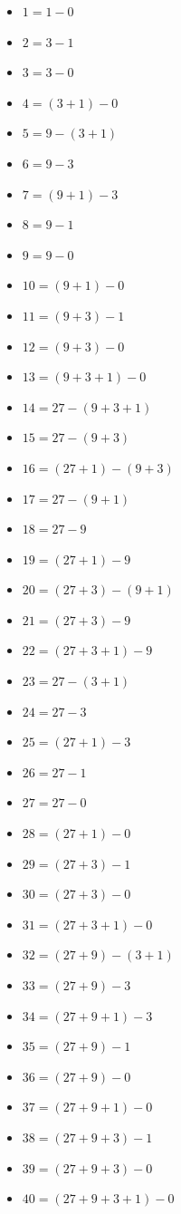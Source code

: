 \begin{multicols}{3}
\begin{itemize}
\item $1=1-0$
\item $2=3-1$
\item $3=3-0$
\item $4=(3+1)-0$
\item $5=9-(3+1)$
\item $6=9-3$
\item $7=(9+1)-3$
\item $8=9-1$
\item $9=9-0$
\item $10=(9+1)-0$
\item $11=(9+3)-1$
\item $12=(9+3)-0$
\item $13=(9+3+1)-0$
\item $14=27-(9+3+1)$
\item $15=27-(9+3)$
\item $16=(27+1)-(9+3)$
\item $17=27-(9+1)$
\item $18=27-9$
\item $19=(27+1)-9$
\item $20=(27+3)-(9+1)$
\item $21=(27+3)-9$
\item $22=(27+3+1)-9$
\item $23=27-(3+1)$
\item $24=27-3$
\item $25=(27+1)-3$
\item $26=27-1$
\item $27=27-0$
\item $28=(27+1)-0$
\item $29=(27+3)-1$
\item $30=(27+3)-0$
\item $31=(27+3+1)-0$
\item $32=(27+9)-(3+1)$
\item $33=(27+9)-3$
\item $34=(27+9+1)-3$
\item $35=(27+9)-1$
\item $36=(27+9)-0$
\item $37=(27+9+1)-0$
\item $38=(27+9+3)-1$
\item $39=(27+9+3)-0$
\item $40=(27+9+3+1)-0$
\end{itemize}
\end{multicols}

